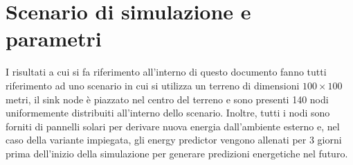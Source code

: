 \documentclass[binding=0.6cm,TFA]{sapthesis}
\begin{document}
\newpage

\section{Scenario di simulazione e parametri}

I risultati a cui si fa riferimento all'interno di questo documento fanno tutti riferimento ad uno scenario in cui si utilizza un terreno di dimensioni
$100 \times 100$ metri, il sink node è piazzato nel centro del terreno e sono presenti 140 nodi uniformemente distribuiti all'interno dello scenario.
Inoltre, tutti i nodi sono forniti di pannelli solari per derivare nuova energia dall'ambiente esterno e, nel caso della variante impiegata, gli energy predictor
vengono allenati per 3 giorni prima dell'inizio della simulazione per generare predizioni energetiche nel futuro.\\
\end{document}
